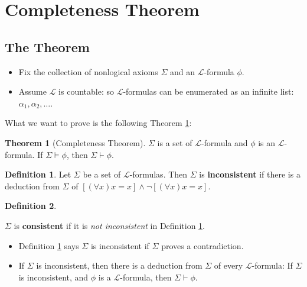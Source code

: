 \documentclass[11pt,letterpaper]{book}
\theoremstyle{definition}
\newtheorem{definition}{Definition}[section]
\newtheorem{theorem}{Theorem}[section]
\begin{document}
\section{Completeness Theorem}

\subsection{The Theorem}
\begin{itemize}
       \item{Fix the collection of nonlogical axioms $\Sigma$ and an
$\mathcal{L}$-formula $\phi$.}
       \item{Assume $\mathcal{L}$ is countable: so $\mathcal{L}$-formulas
can be enumerated as an infinite list: $\alpha_1, \alpha_2, \ldots$. }
\end{itemize}

What we want to prove is the following Theorem
\ref{theorem:completeness_theorem}:

\begin{theorem}[Completeness Theorem]\label{theorem:completeness_theorem}
$\Sigma$ is a set of $\mathcal{L}$-formula and $\phi$ is an
$\mathcal{L}$-formula. If $\Sigma \models \phi$, then $\Sigma \vdash \phi$.

\end{theorem}



\begin{definition}\label{def:inconsistent}
Let $\Sigma$ be a set of $\mathcal{L}$-formulas. Then $\Sigma$ is
\textbf{inconsistent} if there is a deduction from $\Sigma$ of
$[(\forall x) x = x ]\land \lnot [ (\forall x) x = x ]$.

\end{definition}

\begin{definition}\label{def:consistent}

$\Sigma$ is \textbf{consistent} if it is \emph{not inconsistent} in
Definition \ref{def:inconsistent}.

\end{definition}

\begin{itemize}
\item{Definition \ref{def:inconsistent} says $\Sigma$ is inconsistent if
$\Sigma$ proves a contradiction.}
\item{If $\Sigma$ is inconsistent, then there is a deduction from
$\Sigma$ of every $\mathcal{L}$-formula: If $\Sigma$ is inconsistent,
and $\phi$ is a $\mathcal{L}$-formula, then $\Sigma \vdash \phi$.}

\end{itemize}
\end{document}
